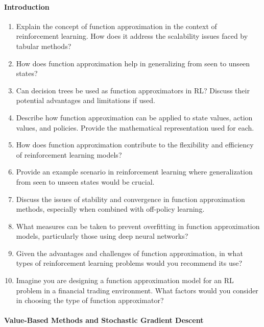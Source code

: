 \paragraph*{Introduction}
\begin{enumerate}[nosep]
	\item Explain the concept of function approximation in the context of reinforcement learning. How does it address the scalability issues faced by tabular methods?
    \item How does function approximation help in generalizing from seen to unseen states?
    \item Can decision trees be used as function approximators in RL? Discuss their potential advantages and limitations if used.
    \item Describe how function approximation can be applied to state values, action values, and policies. Provide the mathematical representation used for each.
    \item How does function approximation contribute to the flexibility and efficiency of reinforcement learning models?
    \item Provide an example scenario in reinforcement learning where generalization from seen to unseen states would be crucial.
    \item Discuss the issues of stability and convergence in function approximation methods, especially when combined with off-policy learning.
    \item What measures can be taken to prevent overfitting in function approximation models, particularly those using deep neural networks?
    \item Given the advantages and challenges of function approximation, in what types of reinforcement learning problems would you recommend its use?
    \item Imagine you are designing a function approximation model for an RL problem in a financial trading environment. What factors would you consider in choosing the type of function approximator? 
 \end{enumerate}

\paragraph*{Value-Based Methods and Stochastic Gradient Descent}

